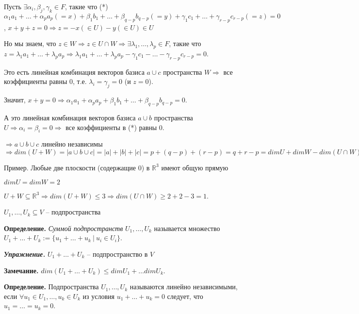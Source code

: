 Пусть $\exists \alpha_i, \beta_j, \gamma_k \in F$, такие что (*) $\alpha_1 a_1 + \dots + \alpha_p a_p (=x) + \beta_1 b_1 + \dots + \beta_{q-p} b_{q-p} (=y) + \gamma_1 c_1 + \dots + \gamma_{r-p} c_{r-p} (=z) = 0$, $x + y + z = 0 \Rightarrow z = - x (\in U) - y (\in U) \in U$

Но мы знаем, что $z \in W \Rightarrow z \in U \cap W \Rightarrow \exists \lambda_1, \dots, \lambda_p \in F$, такие что $z = \lambda_1 a_1 + \dots + \lambda_p a_p \Rightarrow \lambda_1 a_1 + \dots + \lambda_p a_p - \gamma_1 c_1 - \dots - \gamma_{r-p} c_{r-p} = 0$.  

Это есть линейная комбинация векторов базиса $a \cup c$ пространства $W \Rightarrow$ все коэффициенты равны 0, т.е. $\lambda_i = \gamma_j = 0$ (и $z = 0$).

Значит, $x + y = 0 \Rightarrow \alpha_1 a_1 + \alpha_p a_p + \beta_1 b_1 + \dots + \beta_{q-p} b_{q-p} = 0$.

А это линейная комбинация векторов базиса $a \cup b$ пространства $U \Rightarrow \alpha_i = \beta_i = 0 \Rightarrow$ все коэффициенты в (*) равны 0.

$\Rightarrow a \cup b \cup c$ линейно независимы $\Rightarrow dim (U + W) = |a \cup b \cup c| = |a| + |b| + |c| = p + (q - p) + (r - p) = q + r - p = dimU + dim W - dim(U \cap W) \lhd.$

\vspace{\baselineskip}
Пример. Любые две плоскости (содержащие 0) в $\mathbb{R}^3$ имеют общую прямую 

$dimU = dimW = 2$

$U + W \subseteq \mathbb{R}^3 \Rightarrow dim(U + W) \leq 3 \Rightarrow dim(U \cap W) \geq 2 + 2 - 3 = 1$.

\vspace{\baselineskip}
$U_1, \dots, U_k \subseteq V$ -- подпространства

\vspace{\baselineskip}
\textbf{Определение.} \textit{Суммой подпространств} $U_1, \dots, U_k$ называется множество $U_1 + \dots + U_k := \{u_1 + \dots + u_k \ | \ u_i \in U_i\}$.

\vspace{\baselineskip}
\textbf{\textit{Упражнение.}} $U_1 + \dots + U_k$ -- подпространство в $V$

\vspace{\baselineskip}
\textbf{Замечание.} $dim(U_1 + \dots + U_k) \leq dimU_1 + \dots dimU_k$.

\vspace{\baselineskip}
\textbf{Определение.} Подпространства $U_1, \dots, U_k$ называются линейно независимыми, если $\forall u_1 \in U_1, \dots, u_k \in U_k$ из условия $u_1 + \dots + u_k = 0$ следует, что $u_1 = \dots = u_k = 0$.

